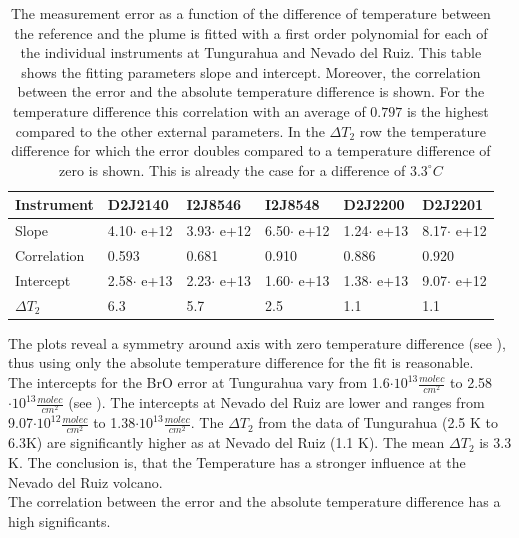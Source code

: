 \begin{table}[h]
	\centering
	\begin{tabular}{|p{2cm}|p{2cm}|p{2cm}|p{2cm}|p{2cm}|p{2cm}|}
		Instrument	&D2J2140&I2J8546& I2J8548&D2J2200&D2J2201\\
		\toprule
		Slope&4.10$\cdot$ e+12 &3.93$\cdot$ e+12 &6.50$\cdot$ e+12 &1.24$\cdot$ e+13&8.17$\cdot$ e+12 \\
		\midrule
		Correlation
		& 
		0.593& 
		0.681& 
		0.910& 
		0.886& 
		0.920\\
		\midrule
		Intercept&2.58$\cdot$ e+13&2.23$\cdot$ e+13&1.60$\cdot$ e+13& 1.38$\cdot$ e+13& 9.07$\cdot$ e+12\\
		\midrule
		$\Delta T_{2}$&6.3&5.7&2.5&1.1&1.1\\
		\bottomrule
	\end{tabular}
	\label{tab:tempe}
	\caption{The  measurement error as a function of the difference of temperature between the reference and the plume is fitted with a first order polynomial for each of the individual instruments at Tungurahua and Nevado del Ruiz. This table shows the fitting parameters slope and intercept. Moreover, the correlation between the  error and the absolute temperature difference is shown. For the temperature difference this correlation with an average of $0.797$ is the highest compared to the other external parameters. In the $\Delta T_{2}$ row the temperature difference for which the error doubles compared to a temperature difference of zero is shown. This is already the case for a difference of $3.3^\circ C$}
\end{table}
The plots reveal a symmetry around axis with zero temperature difference (see ), thus using only the absolute temperature difference for the fit is reasonable.\\
The intercepts for the BrO error at Tungurahua vary from 1.6$\cdot10^{13}\frac{molec}{cm^2}$ to 2.58$\cdot10^{13}\frac{molec}{cm^2}$ (see ). The intercepts at Nevado del Ruiz are lower and ranges from  9.07$\cdot10^{12}\frac{molec}{cm^2}$ to 1.38$\cdot10^{13}\frac{molec}{cm^2}$. The $\Delta T_{2}$ from the data of Tungurahua (2.5 K to 6.3K) are significantly higher as at Nevado del Ruiz (1.1 K). The mean $\Delta T_{2}$ is $ 3.3$K. The conclusion is, that the Temperature has a stronger influence at the Nevado del Ruiz volcano.\\
The correlation between the  error and the absolute temperature difference has a high significants. 
